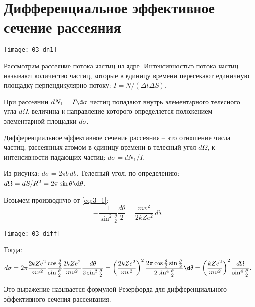 \section{Дифференциальное эффективное сечение рассеяния}

\begin{minipage}{.35\textwidth}
    \texttt{[image: 03\_dn1]}
\end{minipage}
\begin{minipage}{.6\textwidth}
Рассмотрим рассеяние потока частиц на ядре. Интенсивностью потока частиц
называют количество частиц, которые в единицу времени пересекают единичную
площадку перпендикулярно потоку: \( I = N/(\Delta t\Delta S) \).
 
При рассеянии \( dN_1 = I\d\sigma \) частиц попадают внутрь элементарного
телесного угла \( d\Omega \), величина и направление которого определяется
положением элементарной площадки \( d\sigma \).
\end{minipage}

\begin{minipage}{.55\textwidth}
Дифференциальное эффективное сечение рассеяния -- это отношение числа частиц,
рассеянных атомом в единицу времени в телесный угол \( d\Omega \), к
интенсивности падающих частиц: \( d\sigma = dN_1/I \).

Из рисунка: \( d\sigma = 2\pi b\,db \). Телесный угол, по определению:
\( d\Omega = dS/R^2 = 2\pi\sin\theta\d\theta \).

Возьмем производную от \eqref{eq:3_1}:
\[
    -\frac{1}{\sin^2\frac{\theta}{2}}\frac{d\theta}{2} = \frac{mv^2}{2kZe^2}\,db.
\]
\end{minipage}
\begin{minipage}{.4\textwidth}
    \texttt{[image: 03\_diff]}
\end{minipage}
Тогда:
\[
    d\sigma = 2\pi\frac{2kZe^2}{mv^2}\frac{\cos\frac{\theta}{2}}{\sin\frac
    {\theta}{2}}\frac{2kZe^2}{mv^2}\frac{d\theta}{2\sin^2\frac{\theta}{2}} =
    \left( \frac{2kZe^2}{mv^2} \right)^2 \frac{2\pi\cos\frac{\theta}{2}\sin
    \frac{\theta}{2}}{2\sin^4\frac{\theta}{2}}\d\theta = \left( \frac{kZe^2}
    {mv^2} \right)^2 \frac{d\Omega}{\sin^4\frac{\theta}{2}}.
\]

Это выражение называется формулой Резерфорда для дифференциального эффективного
сечения рассеивания.

\newpage
